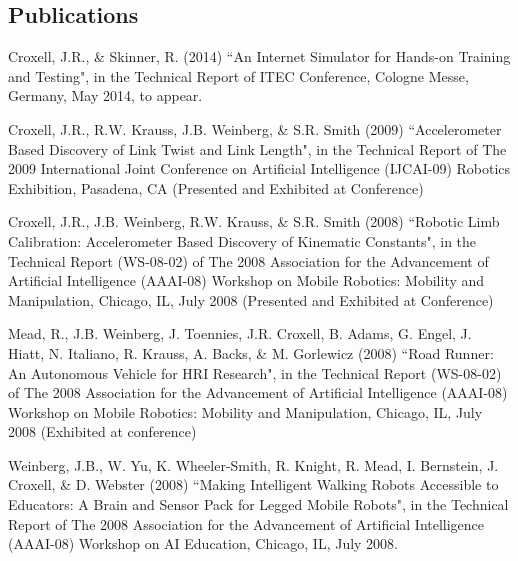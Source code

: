 \documentclass[margin,line]{resume}
\begin{document}
\begin{resume}
\section{Publications}

Croxell, J.R., \& Skinner, R. (2014) ``An Internet Simulator for Hands-on
Training and Testing", in the Technical Report of ITEC Conference, Cologne
Messe, Germany, May 2014, to appear.

Croxell, J.R., R.W. Krauss, J.B. Weinberg, \& S.R. Smith (2009) ``Accelerometer
Based Discovery of Link Twist and Link Length", in the Technical Report of The
2009 International Joint Conference on Artificial Intelligence (IJCAI-09)
Robotics Exhibition, Pasadena, CA (Presented and Exhibited at Conference)

Croxell, J.R., J.B. Weinberg, R.W. Krauss, \& S.R. Smith (2008) ``Robotic Limb
Calibration:  Accelerometer Based Discovery of Kinematic Constants", in the
Technical Report (WS-08-02) of The 2008 Association for the Advancement of
Artificial Intelligence (AAAI-08) Workshop on Mobile Robotics: Mobility and
Manipulation, Chicago, IL, July 2008 (Presented and Exhibited at Conference)

Mead, R., J.B. Weinberg, J. Toennies, J.R. Croxell, B. Adams, G. Engel, J.
Hiatt, N. Italiano, R. Krauss, A. Backs, \& M. Gorlewicz (2008) ``Road Runner:
An Autonomous Vehicle for HRI Research", in the Technical Report (WS-08-02) of
The 2008 Association for the Advancement of Artificial Intelligence (AAAI-08)
Workshop on Mobile Robotics: Mobility and Manipulation, Chicago, IL, July 2008
(Exhibited at conference)

Weinberg, J.B., W. Yu, K. Wheeler-Smith, R. Knight, R. Mead, I. Bernstein, J.
Croxell, \& D. Webster (2008) ``Making Intelligent Walking Robots Accessible to
Educators: A Brain and Sensor Pack for Legged Mobile Robots", in the Technical
Report of The 2008 Association for the Advancement of Artificial Intelligence
(AAAI-08) Workshop on AI Education, Chicago, IL, July 2008.\\

\end{resume}
\end{document}
